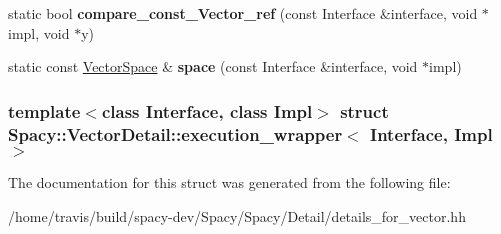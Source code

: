 \begin{DoxyCompactItemize}
\item 
\hypertarget{structSpacy_1_1VectorDetail_1_1execution__wrapper_ac0504ef5aa84b7c23c2287fb3fa2ad92}{static bool {\bfseries compare\-\_\-const\-\_\-\-Vector\-\_\-ref} (const \-Interface \&interface, void $\ast$impl, void $\ast$y)}\label{structSpacy_1_1VectorDetail_1_1execution__wrapper_ac0504ef5aa84b7c23c2287fb3fa2ad92}

\item 
\hypertarget{structSpacy_1_1VectorDetail_1_1execution__wrapper_a77b3315c3642153d37b5e28130c1f41c}{static const \hyperlink{classSpacy_1_1VectorSpace}{\-Vector\-Space} \& {\bfseries space} (const \-Interface \&interface, void $\ast$impl)}\label{structSpacy_1_1VectorDetail_1_1execution__wrapper_a77b3315c3642153d37b5e28130c1f41c}

\end{DoxyCompactItemize}
\subsubsection*{template$<$class Interface, class Impl$>$ struct Spacy\-::\-Vector\-Detail\-::execution\-\_\-wrapper$<$ Interface, Impl $>$}



\-The documentation for this struct was generated from the following file\-:\begin{DoxyCompactItemize}
\item 
/home/travis/build/spacy-\/dev/\-Spacy/\-Spacy/\-Detail/details\-\_\-for\-\_\-vector.\-hh\end{DoxyCompactItemize}
